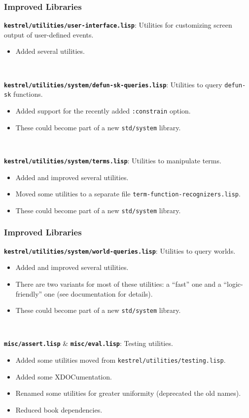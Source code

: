 \documentclass{beamer}
\newcommand{\code}[1]{\texttt{#1}}
\newcommand{\bookpath}[1]{\textbf{\code{#1}}}
\newcommand{\implibtitle}{\frametitle{Improved Libraries}}
\begin{document}
\begin{frame}

\implibtitle

\bookpath{kestrel/utilities/user-interface.lisp}:
Utilities for customizing screen output of user-defined events.
\begin{itemize}
\item
Added several utilities.
\end{itemize}

\

\bookpath{kestrel/utilities/system/defun-sk-queries.lisp}:
Utilities to query \code{defun-sk} functions.
\begin{itemize}
\item
Added support for the recently added \code{:constrain} option.
\item
These could become part of a new \code{std/system} library.
\end{itemize}

\

\bookpath{kestrel/utilities/system/terms.lisp}:
Utilities to manipulate terms.
\begin{itemize}
\item
Added and improved several utilities.
\item
Moved some utilities to a separate file
\code{term-function-recognizers.lisp}.
\item
These could become part of a new \code{std/system} library.
\end{itemize}

\end{frame}


\begin{frame}

\implibtitle

\bookpath{kestrel/utilities/system/world-queries.lisp}:
Utilities to query worlds.
\begin{itemize}
\item
Added and improved several utilities.
\item
There are two variants for most of these utilities:
a ``fast'' one and a ``logic-friendly'' one
(see documentation for details).
\item
These could become part of a new \code{std/system} library.
\end{itemize}

\

\bookpath{misc/assert.lisp} \& \bookpath{misc/eval.lisp}:
Testing utilities.
\begin{itemize}
\item
Added some utilities moved from \code{kestrel/utilities/testing.lisp}.
\item
Added some XDOCumentation.
\item
Renamed some utilities for greater uniformity
(deprecated the old names).
\item
Reduced book dependencies.
\end{itemize}

\end{frame}
\end{document}
